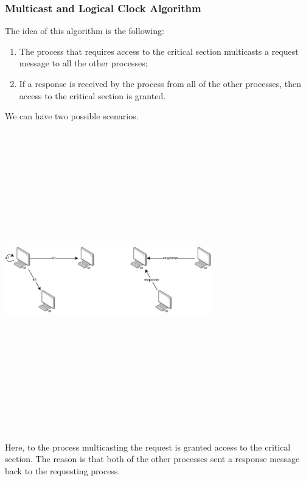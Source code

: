 \documentclass{article}
\begin{document}
\subsubsection{Multicast and Logical Clock Algorithm}
The idea of this algorithm is the following:
\begin{enumerate}
	\item The process that requires access to the critical section multicasts a request message to all the other processes;
	\item If a response is received by the process from all of the other processes, then access to the critical section is granted.
\end{enumerate}
We can have two possible scenarios.
\begin{center}
	\includegraphics[width=9cm, height=13cm, keepaspectratio]{assets/multicast-1.pdf}
\end{center}
Here, to the process multicasting the request is granted access to the critical section. The reason is that both of the other processes sent a response message back to the requesting process.
\end{document}

